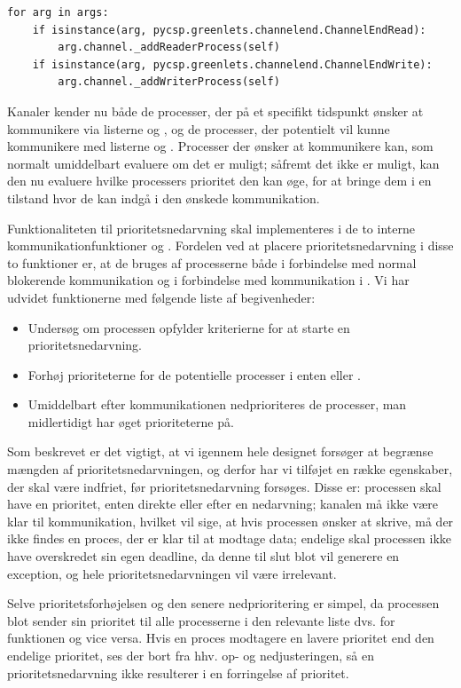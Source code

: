 \begin{lstlisting}[firstnumber=29 ,float=hbtp, label=lst:process-init, caption=Uddrag af \code{Process}' \code{\_\_init\_\_}funktion]
for arg in args:
    if isinstance(arg, pycsp.greenlets.channelend.ChannelEndRead):
        arg.channel._addReaderProcess(self)
    if isinstance(arg, pycsp.greenlets.channelend.ChannelEndWrite):
        arg.channel._addWriterProcess(self)  
\end{lstlisting}

Kanaler kender nu  både de processer, der på et specifikt tidspunkt ønsker at kommunikere via listerne  og , og de processer, der potentielt vil kunne kommunikere med listerne  og . Processer der ønsker at kommunikere kan, som normalt umiddelbart evaluere om det er muligt; såfremt det ikke er muligt, kan den nu evaluere hvilke processers prioritet den kan øge, for at bringe dem i en tilstand hvor de kan indgå i den ønskede kommunikation. 

Funktionaliteten til prioritetsnedarvning skal implementeres i de to interne kommunikationfunktioner   og . Fordelen ved at placere prioritetsnedarvning i disse to funktioner er, at de bruges af processerne både i forbindelse med normal blokerende kommunikation og i forbindelse med kommunikation i . Vi har udvidet funktionerne med følgende liste af begivenheder:
\begin{itemize}
\tightlist
	\item Undersøg om processen opfylder kriterierne for at starte en prioritetsnedarvning.
	\item Forhøj prioriteterne for de potentielle processer i enten  eller .
	\item Umiddelbart efter kommunikationen nedprioriteres de processer, man midlertidigt har øget prioriteterne på.
\end{itemize}

Som beskrevet er det vigtigt, at vi igennem hele designet forsøger at begrænse mængden af prioritetsnedarvningen, og derfor har vi tilføjet en række egenskaber, der skal være indfriet, før prioritetsnedarvning forsøges. Disse er: processen skal have en prioritet, enten direkte eller efter en nedarvning; kanalen må ikke være klar til kommunikation, hvilket vil sige, at hvis processen ønsker at skrive, må der ikke findes en proces, der er klar til at modtage data; endelige skal processen ikke have overskredet sin egen deadline, da denne til slut blot vil generere en exception, og hele prioritetsnedarvningen vil være irrelevant.

Selve prioritetsforhøjelsen og den senere nedprioritering er simpel, da processen blot sender sin prioritet til alle processerne i den relevante liste dvs.  for   funktionen og vice versa. Hvis en proces modtagere en lavere prioritet end den endelige prioritet, ses der bort fra hhv. op- og nedjusteringen, så en prioritetsnedarvning ikke resulterer i en forringelse af prioritet. 

